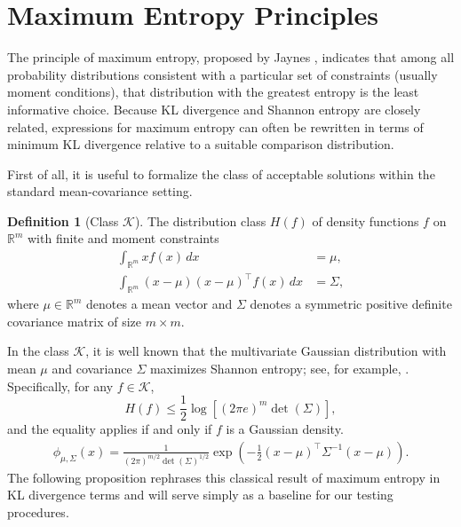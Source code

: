 \documentclass[12pt,a4paper]{article}
\theoremstyle{definition}
\newtheorem{definition}{Definition}[section]
\theoremstyle{plain}
\begin{document}
\section{Maximum Entropy Principles}
\label{sec:maxent}

The principle of maximum entropy, proposed by Jaynes \cite{Jaynes1957}, indicates that among all probability distributions consistent with a particular set of constraints (usually moment conditions), that distribution with the greatest entropy
is the least informative choice. Because KL divergence and Shannon entropy are closely related, expressions for maximum entropy can often be rewritten in terms of minimum KL divergence relative to a suitable comparison distribution.

First of all, it is useful to formalize the class of acceptable solutions within the standard mean-covariance
setting.

\begin{definition}[Class $\mathcal{K}$]\label{def:classK_KL}
The distribution class $H(f)$ of density functions $f$ on $\mathbb{R}^m$
with finite and moment constraints
\begin{align*}
\int_{\mathbb{R}^m} {x} f({x})\,d{x} &= {\mu}, \\
\int_{\mathbb{R}^m} ({x} - {\mu})({x} - {\mu})^{\top} f({x})\,d{x}
&= {\Sigma},
\end{align*}
where ${ \mu} \in \mathbb{R}^m$ denotes a mean vector and ${{\Sigma}}$ denotes a symmetric positive definite covariance matrix of size $m \times m$.
\end{definition}

In the class $\mathcal{K}$, it is well known that the multivariate Gaussian distribution with mean ${\mu}$ and covariance ${\Sigma}$ maximizes Shannon entropy; see, for example, \cite{cover2006elements,kullback1997information,jaynes2003probability}. Specifically, for any $f \in \mathcal{K}$,
\begin{equation}\label{eq:gaussian_maxent}
H(f) \leq \frac{1}{2}\log\left[(2\pi e)^m \det({\Sigma})\right],
\end{equation} and the equality applies if and only if $f$ is a Gaussian density.
\begin{align}
\phi_{{\mu},{\Sigma}}({x})
= \frac{1}{(2\pi)^{m/2}\det({\Sigma})^{1/2}}
\exp\!\left(-\frac{1}{2}({x}-{\mu})^{\top}{\Sigma}^{-1}({x}-{\mu})\right). \label{eq_gaussian_density}
\end{align}
The following proposition rephrases this classical result of maximum entropy in KL divergence terms and will serve simply as a baseline for our testing procedures.
\end{document}
